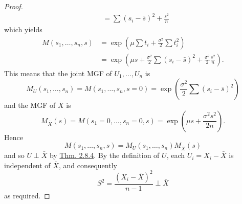 \documentclass[11pt,fleqn]{book} %
\begin{document}
\begin{proof}
\[\begin{aligned}
&= \sum(s_i - \bar{s})^2 + \frac{s^2}{n}
\end{aligned}
\]
which yields
\[
\begin{aligned}
M(s_1, \ldots, s_n, s) &= \exp\left(\mu\sum t_i + \frac{\sigma^2}{2}\sum t_i^2\right) \\
&= \exp\left(\mu s + \frac{\sigma^2}{2}\sum(s_i - \bar{s})^2 + \frac{\sigma^2}{2}\frac{s^2}{n}\right).
\end{aligned}
\]
\indent This means that the joint MGF of \(U_1, \ldots, U_n\) is
\[
M_U(s_1, \ldots, s_n) = M(s_1, \ldots, s_n, s=0) = \exp\left(\frac{\sigma^2}{2}\sum(s_i - \bar{s})^2\right)
\]
and the MGF of \(\bar{X}\) is
\[
M_{\bar{X}}(s) = M(s_1 = 0, \ldots, s_n = 0, s) = \exp\left(\mu s + \frac{\sigma^2s^2}{2n}\right).
\]
\indent Hence
\[
M(s_1, \ldots, s_n, s) = M_U(s_1, \ldots, s_n)M_{\bar{X}}(s)
\]
and so \(U \perp \bar{X}\) by \hyperref[thm:284]{Thm. 2.8.4}. By the definition of \(U\), each \(U_i = X_i - \bar{X}\) is independent of \(\bar{X}\), and consequently
\[
S^2 = \frac{(X_i - \bar{X})^2}{n - 1} \perp \bar{X}
\]
as required.
\end{proof}
\end{document}
